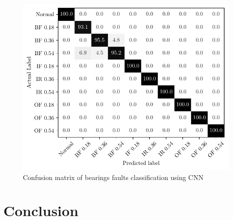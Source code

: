 \begin{figure}[H]
    \centering
    \includegraphics{figures/cw_bearings_faults_classification.pdf}
    \caption{Confusion matrix of bearings faults classification using CNN}
    \label{fig:bearings_faults_classification_confusion_matrix}
\end{figure}

\section{Conclusion}

